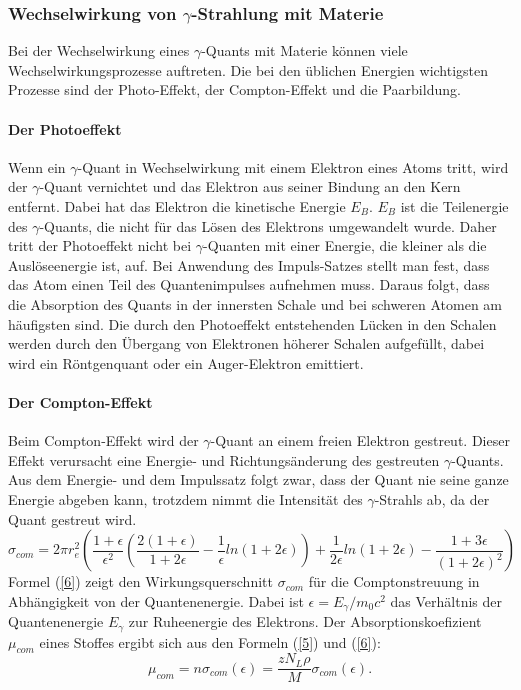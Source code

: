 \documentclass[11pt,ngerman,a4paper]{article}
\begin{document}
\subsubsection{Wechselwirkung von $\gamma$-Strahlung mit Materie}
Bei der Wechselwirkung eines $\gamma$-Quants mit Materie können viele Wechselwirkungsprozesse auftreten. Die bei den üblichen Energien wichtigsten Prozesse sind der Photo-Effekt, der Compton-Effekt und die Paarbildung.
\paragraph{Der Photoeffekt}
Wenn ein $\gamma$-Quant in Wechselwirkung mit einem Elektron eines Atoms tritt, wird der $\gamma$-Quant vernichtet und das Elektron aus seiner Bindung an den Kern entfernt. Dabei hat das Elektron die kinetische Energie $E_B$. $E_B$ ist die Teilenergie des $\gamma$-Quants, die nicht für das Lösen des Elektrons umgewandelt wurde. Daher tritt der Photoeffekt nicht bei $\gamma$-Quanten mit einer Energie, die kleiner als die Auslöseenergie ist, auf. Bei Anwendung des Impuls-Satzes stellt man fest, dass das Atom einen Teil des Quantenimpulses aufnehmen muss. Daraus folgt, dass die Absorption des Quants in der innersten Schale und bei schweren Atomen am häufigsten sind. Die durch den Photoeffekt entstehenden Lücken in den Schalen werden durch den Übergang von Elektronen höherer Schalen aufgefüllt, dabei wird ein Röntgenquant oder ein Auger-Elektron emittiert.
\paragraph{Der Compton-Effekt}
Beim Compton-Effekt wird der $\gamma$-Quant an einem freien Elektron gestreut. Dieser Effekt verursacht eine Energie- und Richtungsänderung des gestreuten $\gamma$-Quants. Aus dem Energie- und dem Impulssatz folgt zwar, dass der Quant nie seine ganze Energie abgeben kann, trotzdem nimmt die Intensität des $\gamma$-Strahls ab, da der Quant gestreut wird.
\begin{equation}
\sigma_{com} = 2\pi r_e^2\left(\frac{1+\epsilon}{\epsilon^2} \left( \frac{2(1+\epsilon)}{1+2\epsilon}-\frac{1}{\epsilon}ln(1+2\epsilon) \right) + \frac{1}{2\epsilon}ln(1+2\epsilon) - \frac{1+3\epsilon}{(1+2\epsilon)^2} \right)
\label{6}
\end{equation}
Formel (\ref{6}) zeigt den Wirkungsquerschnitt $\sigma_{com}$ für die Comptonstreuung in Abhängigkeit von der Quantenenergie. Dabei ist $\epsilon = E_{\gamma} / m_0c^2$ das Verhältnis der Quantenenergie $E_{\gamma}$ zur Ruheenergie des Elektrons. Der Absorptionskoefizient  $\mu_{com}$ eines Stoffes ergibt sich aus den Formeln (\ref{5}) und (\ref{6}):
\begin{equation}
\mu_{com} = n\sigma_{com}(\epsilon) = \frac{zN_L\rho}{M}\sigma_{com}(\epsilon).
\label{7}
\end{equation}
\end{document}
